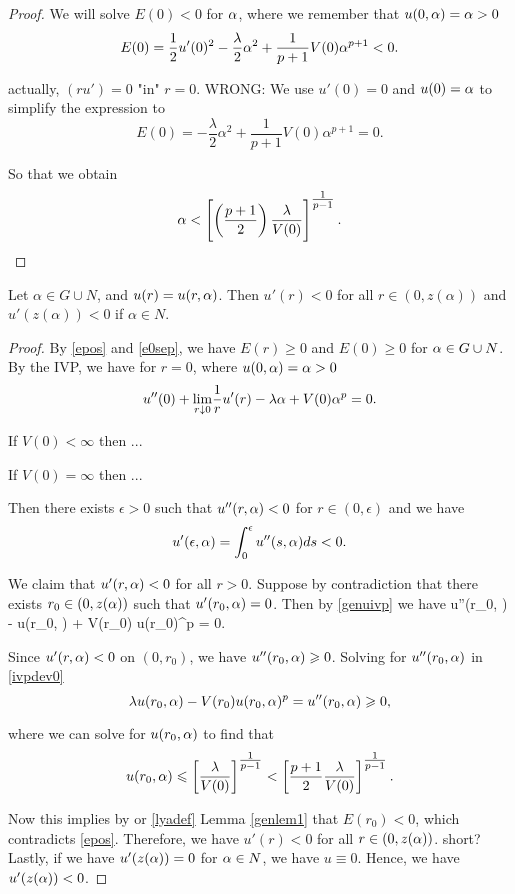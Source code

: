 \begin{proof}
We will solve $E(0) < 0$ for $\alpha$, where we remember that $u(0, \alpha) = \alpha > 0$
\[ 
    E(0) = \frac{1}{2} u'(0)^2 - \frac{\lambda}{2} \alpha^2
    + \frac{1}{p+1} V(0) \alpha^{p+1} < 0. 
\]

{\red actually, $(ru') = 0$ "in" $r=0$. WRONG: We use $u'(0)=0$ and $u(0)=\alpha$ to
    simplify the expression to
\[ 
    E(0) = -\frac{\lambda}{2}\alpha^2 + 
    \frac{1}{p+1} V(0)\alpha^{p+1} = 0. 
\]}

So that we obtain 
\[
\alpha < \left[\left( \frac{p+1}{2}\right) \frac{\lambda}{V(0)}
\right]^{\tfrac{1}{p-1}} .
\]


\end{proof}

\begin{lemma}\label{genlem2}
Let $\alpha \in G \cup N$, and $u(r) = u(r, \alpha)$. Then $u'(r) < 0$ for all
$r \in (0, z(\alpha))$ and $u'(z(\alpha)) < 0$ if $\alpha \in N$.
\end{lemma}
\begin{proof}
By \eqref{epos} and \eqref{e0sep}, we have $E(r) \geq 0$ and $E(0) \geq 
0$ for $\alpha \in G \cup N$. By the IVP, we have for $r=0$, where $u(0, \alpha) = \alpha >
0$
\[ u''(0) + \underset{r \downarrow 0}{\lim} \frac{1}{r} u'(r) -
\lambda \alpha + V(0) \alpha^p = 0. \]

{\red If $V(0) < \infty$ then ...

If $V(0) = \infty$ then ...}

Then there exists $\epsilon > 0$ such that $u''(r, \alpha) < 0$ for $r \in (0,
\epsilon)$ and we have
\[ u'(\epsilon, \alpha) = \int_0^\epsilon u''(s, \alpha) ds < 0. \]

We claim that $u'(r, \alpha) < 0$ for all $r > 0$. Suppose by contradiction that
there exists $r_0 \in (0,z(\alpha))$ such that $u'(r_0, \alpha)=0$. Then by
\eqref{genuivp} we have 
\be \label{ivpdev0} 
u''(r_0, \a) - \lambda u(r_0, \a) + V(r_0) u(r_0)^p = 0. 
\ee

Since $u'(r, \alpha) < 0$ on $(0, r_0)$, we have $u''(r_0, \alpha) \geqslant 0$. 
Solving for $u''(r_0, \alpha)$ in \eqref{ivpdev0} 
\[ \lambda u(r_0,\alpha) - V(r_0) u(r_0,\alpha)^p = u''(r_0, \alpha) \geqslant 0, \]

where we can solve for $u(r_0, \alpha)$ to find that
\[ u(r_0, \alpha) \leqslant \left[ \frac{\lambda}{V(0)} \right]^{\tfrac{1}{p-1}} <
\left[ \frac{p+1}{2} \frac{\lambda}{V(0)} \right]^{\tfrac{1}{p-1}}. \]

Now this implies by {\red or \eqref{lyadef}} Lemma \ref{genlem1} that $E(r_0) <
0$, which contradicts \eqref{epos}. Therefore, we have $u'(r) < 0$ for all $r
\in (0, z(\alpha))$. {\red short?} Lastly, if we have $u'(z(\alpha)) = 0$ for $\alpha \in N$, we have $u
\equiv 0$. Hence, we have $u'(z(\alpha)) < 0$.

\end{proof}

